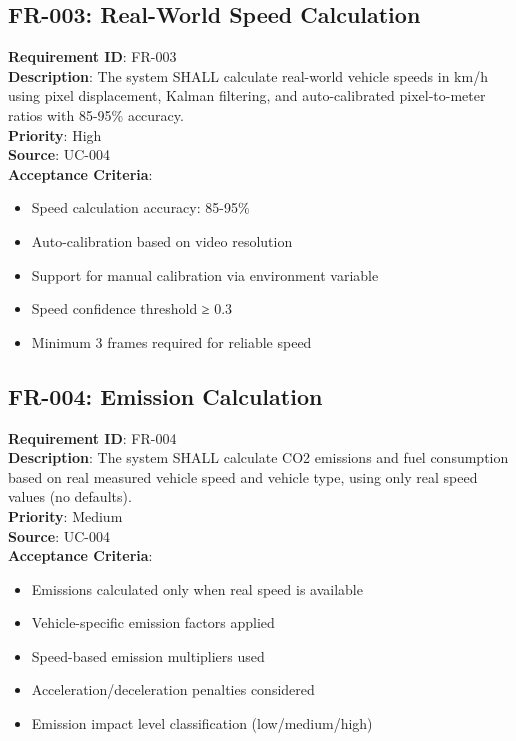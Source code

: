 \documentclass[12pt,a4paper]{article}
\begin{document}
\subsection{FR-003: Real-World Speed Calculation}
\textbf{Requirement ID}: FR-003 \\
\textbf{Description}: The system SHALL calculate real-world vehicle speeds in km/h using pixel displacement, Kalman filtering, and auto-calibrated pixel-to-meter ratios with 85-95\% accuracy. \\
\textbf{Priority}: High \\
\textbf{Source}: UC-004 \\
\textbf{Acceptance Criteria}:
\begin{itemize}
    \item Speed calculation accuracy: 85-95\%
    \item Auto-calibration based on video resolution
    \item Support for manual calibration via environment variable
    \item Speed confidence threshold ≥ 0.3
    \item Minimum 3 frames required for reliable speed
\end{itemize}

\subsection{FR-004: Emission Calculation}
\textbf{Requirement ID}: FR-004 \\
\textbf{Description}: The system SHALL calculate CO2 emissions and fuel consumption based on real measured vehicle speed and vehicle type, using only real speed values (no defaults). \\
\textbf{Priority}: Medium \\
\textbf{Source}: UC-004 \\
\textbf{Acceptance Criteria}:
\begin{itemize}
    \item Emissions calculated only when real speed is available
    \item Vehicle-specific emission factors applied
    \item Speed-based emission multipliers used
    \item Acceleration/deceleration penalties considered
    \item Emission impact level classification (low/medium/high)
\end{itemize}
\end{document}
